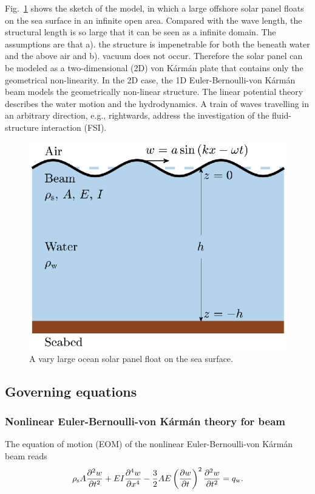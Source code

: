 Fig.~\ref{fig:sketch} shows the sketch of the model, in which a large offshore solar panel floats on the sea surface in an infinite open area. Compared with the wave length, the structural length is so large that it can be seen as a infinite domain. The assumptions are that a). the structure is impenetrable for both the beneath water and the above air and b). vacuum does not occur. Therefore the solar panel can be modeled as a two-dimensional (2D) von K\'{a}rm\'{a}n plate that contains only the geometrical non-linearity. In the 2D case, the 1D Euler-Bernoulli-von K\'{a}rm\'{a}n beam models the geometrically non-linear structure. The linear potential theory describes the water motion and the hydrodynamics. A train of waves travelling in an arbitrary direction, e.g., rightwards, address the investigation of the fluid-structure interaction (FSI).

\begin{figure}
    \includegraphics[width=0.5\columnwidth]{sketch.eps}
    \caption{A vary large ocean solar panel float on the sea surface. }
    \label{fig:sketch}
\end{figure}

\subsection{Governing equations}
\subsubsection{Nonlinear Euler-Bernoulli-von K\'{a}rm\'{a}n theory for beam}
The equation of motion (EOM) of the nonlinear Euler-Bernoulli-von K\'{a}rm\'{a}n beam reads
\begin{equation}
    \rho_\mathrm{s} A \pdv[2]{w}{t} 
    + E I \pdv[4]{w}{x} 
    - \frac{3}{2} A E \left(\pdv{w}{t}\right)^2\pdv[2]{w}{t}
    = q_\mathrm{w}.
    \label{eq: beam}
\end{equation}

